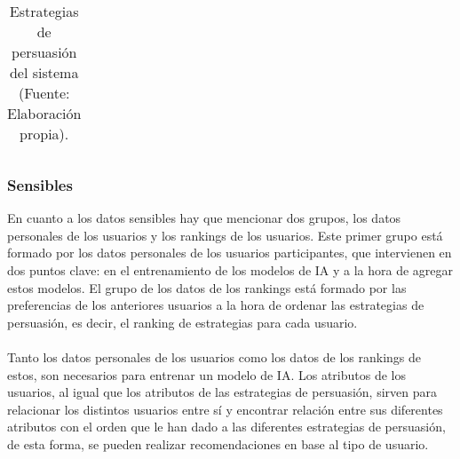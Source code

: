 \begin{table}[H]
\begin{center}
\begin{tabular}{|c|p{0.45\linewidth}|p{0.2\linewidth}|p{0.2\linewidth}|}
        \end{tabular}
        \caption{\centering Estrategias de persuasión del sistema (Fuente: Elaboración propia).}
        \label{tab:EstrategiasPersuasion}
    \end{center}    
\end{table}


\subsubsection{Sensibles}
En cuanto a los datos sensibles hay que mencionar dos grupos, los datos personales de los usuarios y los rankings de los usuarios. Este primer grupo está formado por los datos personales de los usuarios participantes, que intervienen en dos puntos clave: en el entrenamiento de los modelos de IA y a la hora de agregar estos modelos. El grupo de los datos de los rankings está formado por las preferencias de los anteriores usuarios a la hora de ordenar las estrategias de persuasión, es decir, el ranking de estrategias para cada usuario.
\\ \\
Tanto los datos personales de los usuarios como los datos de los rankings de estos, son necesarios para entrenar un modelo de IA. Los atributos de los usuarios, al igual que los atributos de las estrategias de persuasión, sirven para relacionar los distintos usuarios entre sí y encontrar relación entre sus diferentes atributos con el orden que le han dado a las diferentes estrategias de persuasión, de esta forma, se pueden realizar recomendaciones en base al tipo de usuario.

